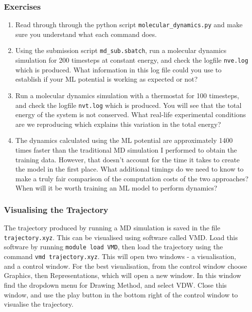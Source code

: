 \documentclass{article}
\begin{document}
\subsubsection*{Exercises}

\begin{enumerate}

\item Read through through the python script \verb|molecular_dynamics.py| and make sure you understand what each command does.
\item Using the submission script \verb|md_sub.sbatch|, run a molecular dynamics simulation for 200 timesteps at constant energy, and check the logfile \verb|nve.log| which is produced. What information in this log file could you use to establish if your ML potential is working as expected or not?
\item Run a molecular dynamics simulation with a thermostat for 100 timesteps, and check the logfile \verb|nvt.log| which is produced. You will see that the total energy of the system is not conserved. What real-life experimental conditions are we reproducing which explains this variation in the total energy?
\item The dynamics calculated using the ML potential are approximately 1400 times faster than the traditional MD simulation I performed to obtain the training data. However, that doesn't account for the time it takes to create the model in the first place. What additional timings do we need to know to make a truly fair comparison of the computation costs of the two approaches? When will it be worth training an ML model to perform dynamics?

\end{enumerate}


\subsubsection*{Visualising the Trajectory}

The trajectory produced by running a MD simulation is saved in the file \verb|trajectory.xyz|. This can be visualised using software called VMD. Load this software by running \verb|module load VMD|, then load the trajectory using the command \verb|vmd trajectory.xyz|. This will open two windows - a visualisation, and a control window. For the best visualisation, from the control window choose Graphics, then Representations, which will open a new window. In this window find the dropdown menu for Drawing Method, and select VDW. Close this window, and use the play button in the bottom right of the control window to visualise the trajectory.
\end{document}
